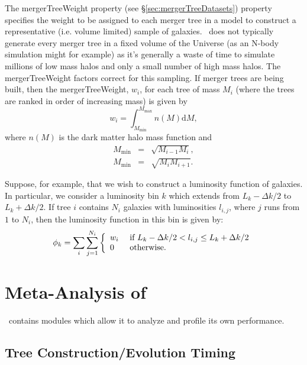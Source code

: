 The {\normalfont \ttfamily mergerTreeWeight} property (see \S\ref{sec:mergerTreeDatasets}) property specifies the weight to be assigned to each merger tree in a model to construct a representative (i.e. volume limited) sample of galaxies. \glc\ does not typically generate every merger tree in a fixed volume of the Universe (as an N-body simulation might for example) as it's generally a waste of time to simulate millions of low mass halos and only a small number of high mass halos. The {\normalfont \ttfamily mergerTreeWeight} factors correct for this sampling. If merger trees are being built, then the {\normalfont \ttfamily mergerTreeWeight}, $w_i$, for each tree of mass $M_i$ (where the trees are ranked in order of increasing mass) is given by
\begin{equation}
 w_i = \int_{M_\mathrm{min}}^{M_\mathrm{max}} n(M) \mathrm{d}M,
\end{equation}
where $n(M)$ is the dark matter halo mass function and
\begin{eqnarray}
 M_\mathrm{min} &=& \sqrt{M_{i-1}M_i}, \\
 M_\mathrm{min} &=& \sqrt{M_i M_{i+1}}.
\end{eqnarray}

Suppose, for example, that we wish to construct a luminosity function of galaxies. In particular, we consider a luminosity bin $k$ which extends from $L_k-\Delta k/2$ to $L_k+\Delta k/2$. If tree $i$ contains $N_i$ galaxies with luminosities $l_{i,j}$, where $j$ runs from $1$ to $N_i$, then the luminosity function in this bin is given by:
\begin{equation}
 \phi_k = \sum_i \sum_{j=1}^{N_i} \left\{ \begin{array}{ll} w_i & \hbox{ if  } L_k-\Delta k/2 < l_{i,j} \le L_k+\Delta k/2 \\ 0 & \hbox{ otherwise.} \end{array} \right.
\end{equation}

\section{Meta-Analysis of \glc}

\glc\ contains modules which allow it to analyze and profile its own performance.

\subsection{Tree Construction/Evolution Timing}\label{sec:MetaTreeTimingProfiler}

